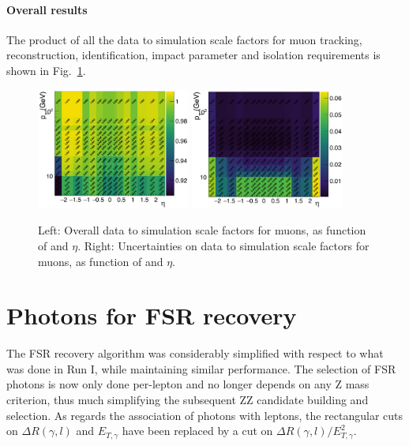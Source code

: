 \paragraph*{Overall results}
The product of all the data to simulation scale factors for muon tracking, reconstruction, identification, impact parameter and isolation requirements is shown in Fig.~\ref{fig:MuonIDEff_5}. 
\begin{figure}[htbp]
  \begin{center}
    \includegraphics[width=0.45\textwidth]{Figures/Muons/mu_sf.pdf}
    \includegraphics[width=0.45\textwidth]{Figures/Muons/mu_sf_unc.pdf}
    \caption{Left: Overall data to simulation scale factors for muons, as function of \pt and $\eta$. Right: Uncertainties on  data to simulation scale factors for muons, as function of \pt and $\eta$.}
    \label{fig:MuonIDEff_5}
\end{center}
\end{figure}


\section{Photons for FSR recovery}
\label{sec:FSRphotons}

The FSR recovery algorithm was considerably simplified with respect to what was done in Run I, while maintaining similar performance. 
The selection of FSR photons is now only done per-lepton and no longer depends on any Z mass criterion, thus much simplifying the subsequent ZZ candidate building and selection. As regards the association of photons with leptons, the rectangular cuts on $\Delta R(\gamma,l)$ and $E_{T,\gamma}$  have been replaced by a cut on $\Delta R(\gamma,l)/E_{T,\gamma}^{2}$.

